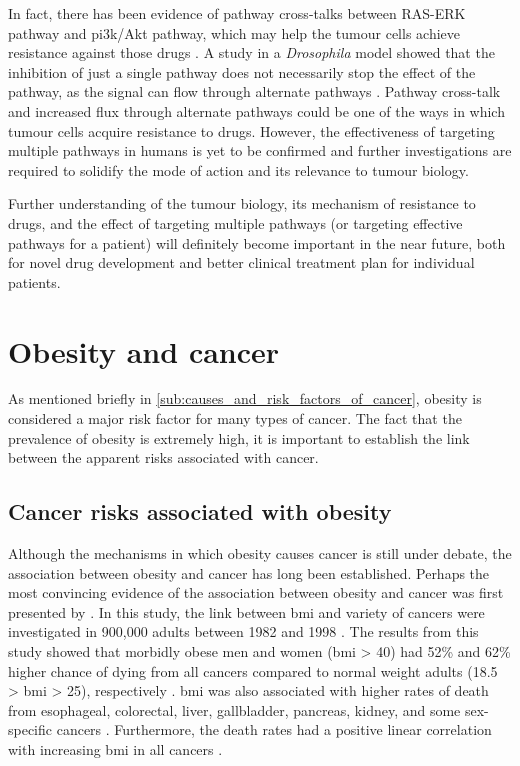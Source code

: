 In fact, there has been evidence of pathway cross-talks between RAS-ERK pathway and \gls{pi3k}/Akt pathway, which may help the tumour cells achieve resistance against those drugs \citep{Moelling2002,Zimmermann1999a}.
A study in a \textit{Drosophila} model showed that the inhibition of just a single pathway does not necessarily stop the effect of the pathway, as the signal can flow through alternate pathways \citep{Dar2012}.
Pathway cross-talk and increased flux through alternate pathways could be one of the ways in which tumour cells acquire resistance to drugs.
However, the effectiveness of targeting multiple pathways in humans is yet to be confirmed and further investigations are required to solidify the mode of action and its relevance to tumour biology.

Further understanding of the tumour biology, its mechanism of resistance to drugs, and the effect of targeting multiple pathways (or targeting effective pathways for a patient) will definitely become important in the near future, both for novel drug development and better clinical treatment plan for individual patients.

\section{Obesity and cancer}
\label{sec:obesity_and_cancer}

As mentioned briefly in \cref{sub:causes_and_risk_factors_of_cancer}, obesity is considered a major risk factor for many types of cancer.
The fact that the prevalence of obesity is extremely high, it is important to establish the link between the apparent risks associated with cancer.

\subsection{Cancer risks associated with obesity}
\label{sub:cancer_risks_associated_with_obesity}

Although the mechanisms in which obesity causes cancer is still under debate, the association between obesity and cancer has long been established.
Perhaps the most convincing evidence of the association between obesity and cancer was first presented by \citet{Calle2003}.
In this study, the link between \gls{bmi} and variety of cancers were investigated in 900,000 adults between 1982 and 1998 \citep{Calle2003}.
The results from this study showed that morbidly obese men and women (\gls{bmi} \textgreater{} 40) had 52\% and 62\% higher chance of dying from all cancers compared to normal weight adults (18.5 \textgreater{} \gls{bmi} \textgreater{} 25), respectively \citep{Calle2003}.
\gls{bmi} was also associated with higher rates of death from esophageal, colorectal, liver, gallbladder, pancreas, kidney, and some sex-specific cancers \citep{Calle2003}.
Furthermore, the death rates had a positive linear correlation with increasing \gls{bmi} in all cancers \citep{Calle2003}.

